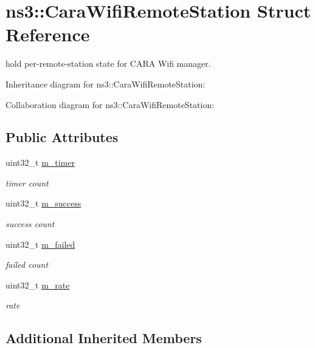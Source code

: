 \hypertarget{structns3_1_1CaraWifiRemoteStation}{}\section{ns3\+:\+:Cara\+Wifi\+Remote\+Station Struct Reference}
\label{structns3_1_1CaraWifiRemoteStation}


hold per-\/remote-\/station state for C\+A\+RA Wifi manager.  




Inheritance diagram for ns3\+:\+:Cara\+Wifi\+Remote\+Station\+:


Collaboration diagram for ns3\+:\+:Cara\+Wifi\+Remote\+Station\+:
\subsection*{Public Attributes}
\begin{DoxyCompactItemize}
\item 
uint32\+\_\+t \hyperlink{structns3_1_1CaraWifiRemoteStation_ab50d2a89c86c4efbefa117a4958114e6}{m\+\_\+timer}
\begin{DoxyCompactList}\small\item\em timer count \end{DoxyCompactList}\item 
uint32\+\_\+t \hyperlink{structns3_1_1CaraWifiRemoteStation_a09ea9a9a8b4a529c025da82895078128}{m\+\_\+success}
\begin{DoxyCompactList}\small\item\em success count \end{DoxyCompactList}\item 
uint32\+\_\+t \hyperlink{structns3_1_1CaraWifiRemoteStation_a2daae56271c3a1d81eb2bf55718f617b}{m\+\_\+failed}
\begin{DoxyCompactList}\small\item\em failed count \end{DoxyCompactList}\item 
uint32\+\_\+t \hyperlink{structns3_1_1CaraWifiRemoteStation_a659ebf2a1fd8aded15cd7e9e5a8e1f2e}{m\+\_\+rate}
\begin{DoxyCompactList}\small\item\em rate \end{DoxyCompactList}\end{DoxyCompactItemize}
\subsection*{Additional Inherited Members}


